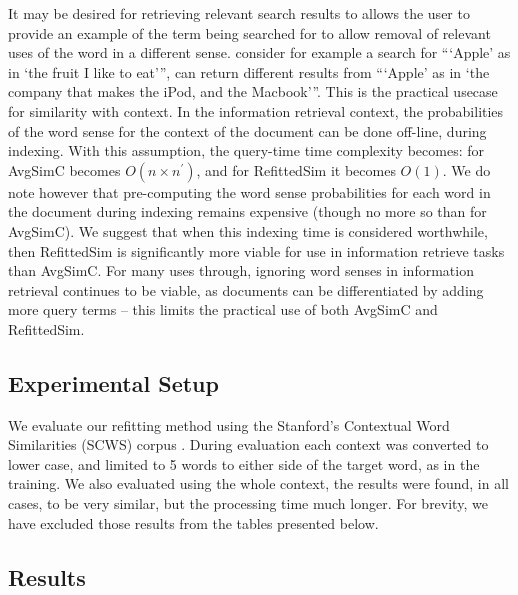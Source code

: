 \documentclass{sig-alternate}
\begin{document}
It may be desired for retrieving relevant search results to allows the user to provide an example of the term being searched for to allow removal of relevant uses of the word in a different sense. consider for example a search for \enquote{\enquote{Apple} as in \enquote{the fruit I like to eat}}, can return different results from \enquote{\enquote{Apple} as in \enquote{the company that makes the iPod, and the Macbook}}. This is the practical usecase for similarity with context.
In the information retrieval context, the probabilities of the word sense for the context of the document can be done off-line, during indexing. With this assumption, the query-time time complexity becomes: for AvgSimC becomes $O(n\times n^{\prime})$, and for RefittedSim it becomes $O(1)$.
We do note however that pre-computing the word sense probabilities for each word in the document during indexing remains expensive (though no more so than for AvgSimC). We suggest that when this indexing time is considered worthwhile, then RefittedSim is significantly more viable for use in information retrieve tasks than AvgSimC. For many uses through, ignoring word senses in information retrieval continues to be viable, as documents can be differentiated by adding more query terms -- this limits the practical use of both AvgSimC and RefittedSim.

\subsection{Experimental Setup}
We evaluate our refitting method using the Stanford's Contextual Word Similarities (SCWS) corpus \parencite{Huang2012}.
During evaluation each context was converted to lower case, and limited to 5 words to either side of the target word, as in the training.
We also evaluated using the whole context, the results were found, in all cases, to be very similar, but the processing time much longer.
For brevity, we have excluded those results from the tables presented below.


\subsection{Results}
\end{document}
